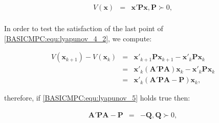      \begin{equation}
        \begin{array}{rcl}
                V(\textbf{x})&=&\textbf{x}'\textbf{P}\textbf{x},\textbf{P}\succ 0,\\
            \end{array}
            \label{BASICMPC:equ:lyapunov_5}
        \end{equation}

    In order to test the satisfaction of the last point of \ref{BASICMPC:equ:lyapunov_4_2}, we compute:

    \begin{equation}
        \begin{array}{rcl}
                V(\textbf{x}_{k+1})-V(\textbf{x}_{k})&=&\textbf{x}'_{k+1}\textbf{P}\textbf{x}_{k+1}-\textbf{x}'_{k}\textbf{P}\textbf{x}_{k}\\
                &=&\textbf{x}'_{k}(\textbf{A}'\textbf{P}\textbf{A})\textbf{x}_{k}-\textbf{x}'_{k}\textbf{P}\textbf{x}_{k}\\
                &=&\textbf{x}'_{k}(\textbf{A}'\textbf{P}\textbf{A}-\textbf{P})\textbf{x}_{k},
            \end{array}
            \label{BASICMPC:equ:lyapunov_6}
        \end{equation}

    therefore, if \ref{BASICMPC:equ:lyapunov_5} holds true then:

    \begin{equation}
        \begin{array}{rcl}
                 \textbf{A}'\textbf{P}\textbf{A}-\textbf{P}&=&-\textbf{Q},\textbf{Q}\succ 0,\\
            \end{array}
            \label{BASICMPC:equ:lyapunov_7}
        \end{equation}

